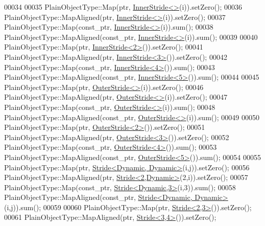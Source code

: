 \begin{DoxyCode}
00034 
00035     PlainObjectType::Map(ptr, \hyperlink{class_eigen_1_1_inner_stride}{InnerStride<>}(i)).setZero();
00036     PlainObjectType::MapAligned(ptr, \hyperlink{class_eigen_1_1_inner_stride}{InnerStride<>}(i)).setZero();
00037     PlainObjectType::Map(const\_ptr, \hyperlink{class_eigen_1_1_inner_stride}{InnerStride<>}(i)).sum();
00038     PlainObjectType::MapAligned(const\_ptr, \hyperlink{class_eigen_1_1_inner_stride}{InnerStride<>}(i)).sum();
00039 
00040     PlainObjectType::Map(ptr, \hyperlink{class_eigen_1_1_inner_stride}{InnerStride<2>}()).setZero();
00041     PlainObjectType::MapAligned(ptr, \hyperlink{class_eigen_1_1_inner_stride}{InnerStride<3>}()).setZero();
00042     PlainObjectType::Map(const\_ptr, \hyperlink{class_eigen_1_1_inner_stride}{InnerStride<4>}()).sum();
00043     PlainObjectType::MapAligned(const\_ptr, \hyperlink{class_eigen_1_1_inner_stride}{InnerStride<5>}()).sum();
00044 
00045     PlainObjectType::Map(ptr, \hyperlink{class_eigen_1_1_outer_stride}{OuterStride<>}(i)).setZero();
00046     PlainObjectType::MapAligned(ptr, \hyperlink{class_eigen_1_1_outer_stride}{OuterStride<>}(i)).setZero();
00047     PlainObjectType::Map(const\_ptr, \hyperlink{class_eigen_1_1_outer_stride}{OuterStride<>}(i)).sum();
00048     PlainObjectType::MapAligned(const\_ptr, \hyperlink{class_eigen_1_1_outer_stride}{OuterStride<>}(i)).sum();
00049 
00050     PlainObjectType::Map(ptr, \hyperlink{class_eigen_1_1_outer_stride}{OuterStride<2>}()).setZero();
00051     PlainObjectType::MapAligned(ptr, \hyperlink{class_eigen_1_1_outer_stride}{OuterStride<3>}()).setZero();
00052     PlainObjectType::Map(const\_ptr, \hyperlink{class_eigen_1_1_outer_stride}{OuterStride<4>}()).sum();
00053     PlainObjectType::MapAligned(const\_ptr, \hyperlink{class_eigen_1_1_outer_stride}{OuterStride<5>}()).sum();
00054 
00055     PlainObjectType::Map(ptr, \hyperlink{group___core___module_class_eigen_1_1_stride}{Stride<Dynamic, Dynamic>}(i,j)).setZero();
00056     PlainObjectType::MapAligned(ptr, \hyperlink{group___core___module_class_eigen_1_1_stride}{Stride<2,Dynamic>}(2,i)).setZero();
00057     PlainObjectType::Map(const\_ptr, \hyperlink{group___core___module_class_eigen_1_1_stride}{Stride<Dynamic,3>}(i,3)).sum();
00058     PlainObjectType::MapAligned(const\_ptr, \hyperlink{group___core___module_class_eigen_1_1_stride}{Stride<Dynamic, Dynamic>}(i,j)).sum();
00059 
00060     PlainObjectType::Map(ptr, \hyperlink{group___core___module_class_eigen_1_1_stride}{Stride<2,3>}()).setZero();
00061     PlainObjectType::MapAligned(ptr, \hyperlink{group___core___module_class_eigen_1_1_stride}{Stride<3,4>}()).setZero();

\end{DoxyCode}
